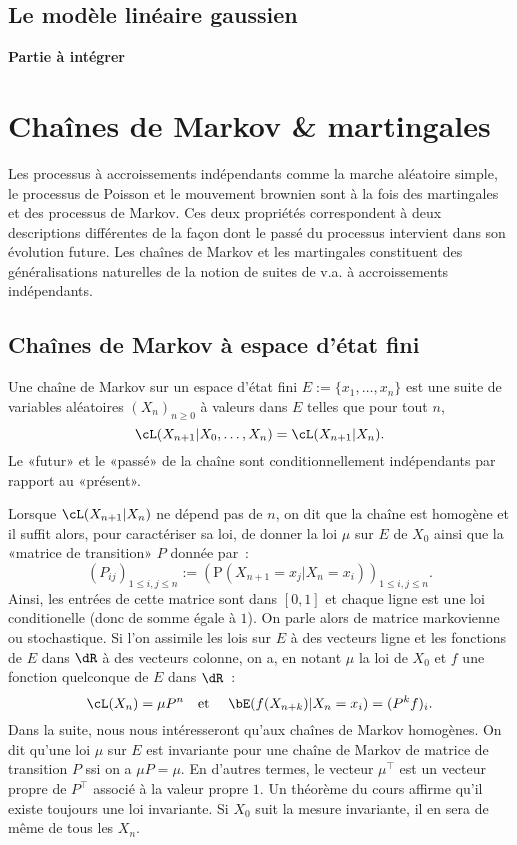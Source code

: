 %
\section{Le modèle linéaire gaussien}
%


\textbf{Partie à intégrer}

%
%
\chapter{Chaînes de Markov \& martingales}
\label{ch:markmart}
%
%

Les processus à accroissements indépendants comme la marche aléatoire simple,
le processus de Poisson et le mouvement brownien sont à la fois des
martingales et des processus de Markov. Ces deux propriétés correspondent à
deux descriptions différentes de la façon dont le passé du processus
intervient dans son évolution future. Les chaînes de Markov et les martingales
constituent des généralisations naturelles de la notion de suites de v.a. à
accroissements indépendants.

%
\section{Chaînes de Markov à espace d'état fini}
\label{se:chaines2marov}
% 
       
Une chaîne de Markov sur un espace d'état fini $E:=\{x_1,\ldots,x_n\}$ est une suite
de variables aléatoires $(X_n)_{n\geq 0}$ à valeurs dans $E$ telles que pour tout
$n$,
$$
\cL(X_{n+1}\vert X_0,\ldots,X_n) = \cL(X_{n+1} \vert X_n).
$$
Le «futur» et le «passé» de la chaîne sont conditionnellement
indépendants par rapport au «présent».

Lorsque $\cL(X_{n+1} \vert X_n)$ ne dépend pas de $n$, on dit que la
chaîne est homogène et il suffit alors, pour caractériser sa loi, de donner la
loi $\mu$ sur $E$ de $X_0$ ainsi que la «matrice de transition» $P$ donnée
par~:
$$
(P_{ij})_{1\leq i,j\leq n} 
:=\left(\mathrm{P}(X_{n+1}=x_j\vert X_n=x_i)\right)_{1\leq i,j\leq n}.
$$
Ainsi, les entrées de cette matrice sont dans $[0,1]$ et chaque ligne est
une loi conditionelle (donc de somme égale à $1$). On parle alors de matrice
markovienne ou stochastique. Si l'on assimile les lois sur $E$ à des vecteurs
ligne et les fonctions de $E$ dans $\dR$ à des vecteurs colonne, on a, en
notant $\mu$ la loi de $X_0$ et $f$ une fonction quelconque de $E$ dans
$\dR$~:
$$
\cL(X_n) = \mu P^n \text{\quad et \quad}
\bE(f(X_{n+k})\vert X_n=x_i)=(P^k f)_i.
$$
Dans la suite, nous nous intéresseront qu'aux chaînes de Markov homogènes.
On dit qu'une loi $\mu$ sur $E$ est invariante pour une chaîne de Markov de
matrice de transition $P$ ssi on a $\mu P = \mu$. En d'autres termes, le
vecteur $\mu^\top$ est un vecteur propre de $P^\top$ associé à la valeur
propre $1$. Un théorème du cours affirme qu'il existe toujours une loi
invariante. Si $X_0$ suit la mesure invariante, il en sera de même de tous les
$X_n$. 

